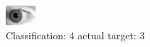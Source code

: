 \begin{figure}[h!]
\begin{center}
\includegraphics[width=0.60\columnwidth]{figures/ID235_class_4_target_3.png}
\end{center}
\caption{ Classification: 4 actual target: 3}
\label{fig:ID235_class_4_target_3}
\end{figure}
